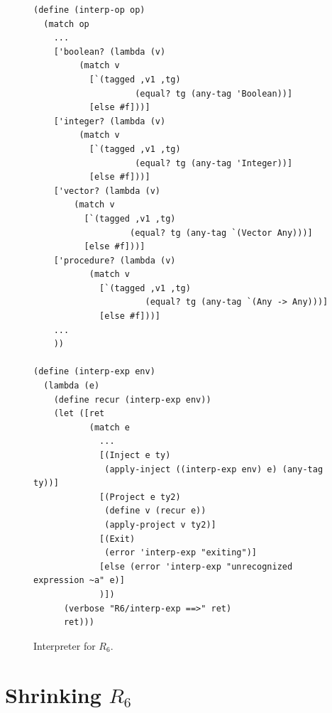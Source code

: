 \documentclass[11pt]{book}
\begin{document}
\begin{figure}[btp]
\begin{lstlisting}
(define (interp-op op)
  (match op
    ...
    ['boolean? (lambda (v)
		 (match v
		   [`(tagged ,v1 ,tg)
                    (equal? tg (any-tag 'Boolean))]
		   [else #f]))]
    ['integer? (lambda (v)
		 (match v
		   [`(tagged ,v1 ,tg)
                    (equal? tg (any-tag 'Integer))]
		   [else #f]))]
    ['vector? (lambda (v)
		(match v
		  [`(tagged ,v1 ,tg)
                   (equal? tg (any-tag `(Vector Any)))]
		  [else #f]))]
    ['procedure? (lambda (v)
		   (match v
		     [`(tagged ,v1 ,tg)
                      (equal? tg (any-tag `(Any -> Any)))]
		     [else #f]))]
    ...
    ))

(define (interp-exp env)
  (lambda (e)
    (define recur (interp-exp env))
    (let ([ret
           (match e
             ...
             [(Inject e ty)
              (apply-inject ((interp-exp env) e) (any-tag ty))]
             [(Project e ty2)
              (define v (recur e))
              (apply-project v ty2)]
             [(Exit)
              (error 'interp-exp "exiting")]
             [else (error 'interp-exp "unrecognized expression ~a" e)]
             )])
      (verbose "R6/interp-exp ==>" ret)
      ret)))
\end{lstlisting}
\caption{Interpreter for $R_6$.}
\label{fig:interp-R6}
\end{figure}


\section{Shrinking $R_6$}
\label{sec:shrink-r6}
\end{document}
